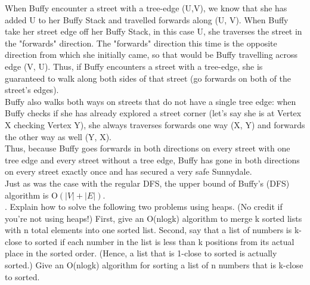 \documentclass[11pt, solution, letterpaper]{format}
\begin{document}
When Buffy encounter a street with a tree-edge (U,V), we know that she has added U to her Buffy Stack and travelled forwards along (U, V). When Buffy take her street edge off her Buffy Stack, in this case U, she traverses the street in the "forwards" direction. The "forwards" direction this time is the opposite direction from which she initially came, so that would be Buffy travelling across edge (V, U). Thus, if Buffy encounters a street with a tree-edge, she is guaranteed to walk along both sides of that street (go forwards on both of the street's edges). \\ 

Buffy also walks both ways on streets that do not have a single tree edge: when Buffy checks if she has already explored a street corner (let's say she is at Vertex X checking Vertex Y), she always traverses forwards one way (X, Y) and forwards the other way as well (Y, X).   \\

Thus, because Buffy goes forwards in both directions on every street with one tree edge and every street without a tree edge, Buffy has gone in both directions on every street exactly once and has secured a very safe Sunnydale.\\

Just as was the case with the regular DFS, the upper bound of Buffy's (DFS) algorithm is O$(|V| + |E|)$.\\


. Explain how to solve the following two problems using heaps. (No credit if you’re not using heaps!) First,
give an O(nlogk) algorithm to merge k sorted lists with n total elements into one sorted list. Second, say that
a list of numbers is k-close to sorted if each number in the list is less than k positions from its actual place in
the sorted order. (Hence, a list that is 1-close to sorted is actually sorted.) Give an O(nlogk) algorithm for
sorting a list of n numbers that is k-close to sorted.\\
\end{document}
